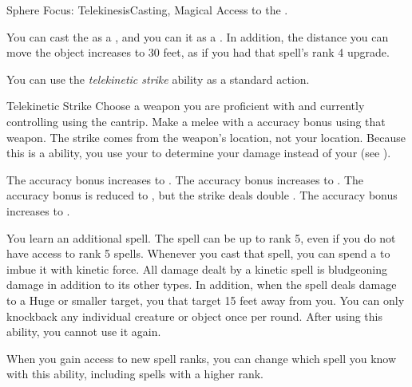     \begin{magicalfeat}{Sphere Focus: Telekinesis}{Casting, Magical}
        \featpre Access to the  .

         You can cast the   as a , and you can  it as a .
        In addition, the distance you can move the object increases to 30 feet, as if you had that spell's rank 4 upgrade.

         You can use the \textit{telekinetic strike} ability as a standard action.
        \begin{magicalactiveability}{Telekinetic Strike}
            \rankline
            Choose a weapon you are proficient with and currently controlling using the  cantrip.
            Make a melee  with a  accuracy bonus using that weapon.
            The strike comes from the weapon's location, not your location.
            Because this is a \magical ability, you use your  to determine your damage instead of your  (see ).

            \rankline
             The accuracy bonus increases to .
             The accuracy bonus increases to .
             The accuracy bonus is reduced to , but the strike deals double .
             The accuracy bonus increases to .
        \end{magicalactiveability}

         You learn an additional spell.
        The spell can be up to rank 5, even if you do not have access to rank 5 spells.
        Whenever you cast that spell, you can spend a  to  imbue it with kinetic force.
        All damage dealt by a kinetic spell is bludgeoning damage in addition to its other types.
        In addition, when the spell deals damage to a Huge or smaller target, you  that target 15 feet away from you.
        You can only knockback any individual creature or object once per round.
        After using this ability, you  cannot use it again.

        When you gain access to new spell ranks, you can change which spell you know with this ability, including spells with a higher rank.


\end{magicalfeat}
